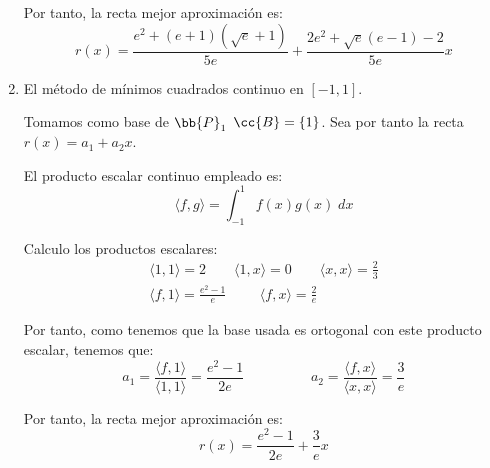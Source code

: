 \begin{ejercicio}
\begin{enumerate}
        Por tanto, la recta mejor aproximación es:
        \begin{equation*}
            r(x)=\frac{e^2 + (e+1)(\sqrt{e}+1)}{5e} + \frac{2e^2 +\sqrt{e}(e-1)-2}{5e}x
        \end{equation*}
        
        
        \item El método de mínimos cuadrados continuo en $[-1, 1]$.
        
        Tomamos como base de $\bb{P}_1$ $\cc{B}=\{1\}$. Sea por tanto la recta $r(x)=a_1 + a_2x$.

        El producto escalar continuo empleado es:
        \begin{equation*}
            \langle f,g\rangle = \int_{-1}^1f(x)g(x)\;dx
        \end{equation*}
    
        Calculo los productos escalares:
        \begin{gather*}
            \langle 1,1\rangle = 2 \qquad
            \langle 1,x\rangle = 0 \qquad
            \langle x,x\rangle = \frac{2}{3}
            \\
            \langle f,1\rangle = \frac{e^2 -1}{e}
            \hspace{1cm}
            \langle f,x\rangle = \frac{2}{e}
        \end{gather*}

        Por tanto, como tenemos que la base usada es ortogonal con este producto escalar, tenemos que:
        \begin{equation*}
            a_1 = \frac{\langle f,1\rangle}{\langle 1,1\rangle} = \frac{e^2 -1}{2e}
            \hspace{2cm}
            a_2 = \frac{\langle f,x\rangle}{\langle x,x\rangle} = \frac{3}{e}
        \end{equation*}

        Por tanto, la recta mejor aproximación es:
        \begin{equation*}
            r(x)=\frac{e^2 -1}{2e} +  \frac{3}{e}x
        \end{equation*}
    \end{enumerate} 
\end{ejercicio}

